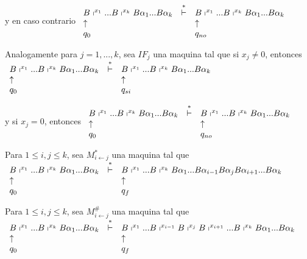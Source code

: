 y en caso contrario
\(\displaystyle \begin{array}{lcl} B\shortmid ^{x_{1}}...B\shortmid ^{x_{k}}B\alpha _{1}...B\alpha _{k} & \overset{\ast }{\vdash } & B\shortmid ^{x_{1}}...B\shortmid ^{x_{k}}B\alpha _{1}...B\alpha _{k} \\ \uparrow & & \uparrow \\ q_{0} & & q_{no} \end{array} \)

Analogamente para \(j=1,...,k\), sea \(IF_{j}\) una maquina tal que si \( x_{j}\neq 0\), entonces
\(\displaystyle \begin{array}{lcl} B\shortmid ^{x_{1}}...B\shortmid ^{x_{k}}B\alpha _{1}...B\alpha _{k} & \overset{\ast }{\vdash } & B\shortmid ^{x_{1}}...B\shortmid ^{x_{k}}B\alpha _{1}...B\alpha _{k} \\ \uparrow & & \uparrow \\ q_{0} & & q_{si} \end{array} \)

y si \(x_{j}=0\), entonces
\(\displaystyle \begin{array}{lcl} B\shortmid ^{x_{1}}...B\shortmid ^{x_{k}}B\alpha _{1}...B\alpha _{k} & \overset{\ast }{\vdash } & B\shortmid ^{x_{1}}...B\shortmid ^{x_{k}}B\alpha _{1}...B\alpha _{k} \\ \uparrow & & \uparrow \\ q_{0} & & q_{no} \end{array} \)

Para \(1\leq i,j\leq k\), sea \(M_{i\leftarrow j}^{\ast }\) una maquina tal que
\(\displaystyle \begin{array}{lcl} B\shortmid ^{x_{1}}...B\shortmid ^{x_{k}}B\alpha _{1}...B\alpha _{k} & \overset{\ast }{\vdash } & B\shortmid ^{x_{1}}...B\shortmid ^{x_{k}}B\alpha _{1}...B\alpha _{i-1}B\alpha _{j}B\alpha _{i+1}...B\alpha _{k} \\ \uparrow & & \uparrow \\ q_{0} & & q_{f} \end{array} \)

Para \(1\leq i,j\leq k\), sea \(M_{i\leftarrow j}^{\#}\) una maquina tal que
\(\displaystyle \begin{array}{lcl} B\shortmid ^{x_{1}}...B\shortmid ^{x_{k}}B\alpha _{1}...B\alpha _{k} & \overset{\ast }{\vdash } & B\shortmid ^{x_{1}}...B\shortmid ^{x_{i-1}}B\shortmid ^{x_{j}}B\shortmid ^{x_{i+1}}...B\shortmid ^{x_{k}}B\alpha _{1}...B\alpha _{k} \\ \uparrow & & \uparrow \\ q_{0} & & q_{f} \end{array} \)

